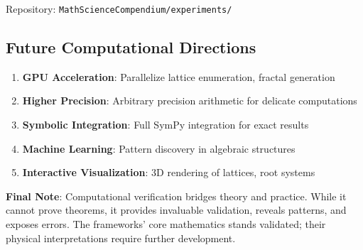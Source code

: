Repository: \texttt{MathScienceCompendium/experiments/}

\subsection{Future Computational Directions}

\begin{enumerate}
    \item \textbf{GPU Acceleration}: Parallelize lattice enumeration, fractal generation
    \item \textbf{Higher Precision}: Arbitrary precision arithmetic for delicate computations
    \item \textbf{Symbolic Integration}: Full SymPy integration for exact results
    \item \textbf{Machine Learning}: Pattern discovery in algebraic structures
    \item \textbf{Interactive Visualization}: 3D rendering of lattices, root systems
\end{enumerate}

\textbf{Final Note}: Computational verification bridges theory and practice. While it cannot prove theorems, it provides invaluable validation, reveals patterns, and exposes errors. The frameworks' core mathematics stands validated; their physical interpretations require further development.
